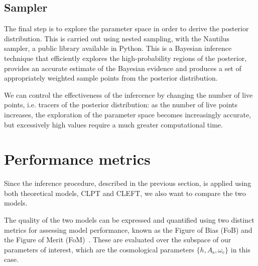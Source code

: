 \documentclass[12pt,a4paper,oneside]{report}
\begin{document}
\subsection{Sampler}\label{subsec:Sampler}
The final step is to explore the parameter space in order to derive the posterior distribution. This is carried out using nested sampling, with the Nautilus sampler, a public library available in Python. This is a Bayesian inference technique that efficiently explores the high-probability regions of the posterior, provides an accurate estimate of the Bayesian evidence and produces a set of appropriately weighted sample points from the posterior distribution.

We can control the effectiveness of the infercence by changing the number of live points, i.e. tracers of the posterior distribution: as the number of live points increases, the exploration of the parameter space becomes increasingly accurate, but excessively high values require a much greater computational time.

\section{Performance metrics}\label{sec:PerformanceMetrics}
Since the inference procedure, described in the previous section, is applied using both theoretical models, CLPT and CLEFT, we also want to compare the two models.

The quality of the two models can be expressed and quantified using two distinct metrics for assessing model performance, known as the Figure of Bias (FoB) and the Figure of Merit (FoM)~\cite{MartinK}. These are evaluated over the subspace of our parameters of interest, which are the cosmological parameters $\{h, A_\mathrm{s}, \omega_\mathrm{c}\}$ in this case.
\end{document}
